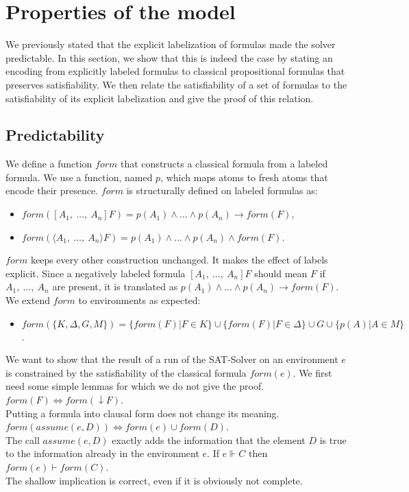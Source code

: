 \documentclass[a4paper,11pt]{article}
\newcommand{\F}{\mathit{form}}
\newcommand{\A}{\mathit{assume}}
\begin{document}
\section{Properties of the model}
We previously stated that the explicit labelization of formulas made the solver predictable.
In this section, we show that this is indeed the case by stating an encoding from
explicitly labeled formulas to classical propositional formulas that preserves satisfiability.
We then relate the satisfiability of a set of formulas to the satisfiability of
its explicit labelization and give the proof of this relation.
\subsection{Predictability}
We define a function $\F$ that constructs a classical formula from a labeled formula. We use
a function, named $p$, which maps atoms to fresh atoms that encode their presence. $\F$ is
structurally defined on labeled formulas as:
\begin{itemize}
 \item $\F([A_1,\ \dots,\ A_n]F)=p(A_1)\wedge\dots\wedge p(A_n)\rightarrow \F(F)$,
 \item $\F(\langle A_1,\ \dots,\ A_n\rangle F)= p(A_1)\wedge\dots\wedge p(A_n)\wedge \F(F)$.
\end{itemize}
$\F$ keeps every other construction unchanged. It makes the effect of labels explicit. Since a
negatively labeled formula $[A_1,\ \dots,\ A_n]F$ should mean $F$ if $A_1,\ \dots,\ A_n$ are
present, it is translated as $p(A_1)\wedge\dots\wedge p(A_n)\rightarrow \F(F)$. We extend
$\F$ to environments as expected:
\begin{itemize}
 \item $\F(\{K,\Delta,G,M\})=\{\F(F)|F\in K\}\cup\{\F(F)|F\in\Delta\}\cup G\cup\{p(A)|A\in M\}$.
\end{itemize}
We want to show that the result of a run of the SAT-Solver on an environment $e$ is constrained by
the satisfiability of the classical formula $\F(e)$. We first need some simple lemmas for which we do
not give the proof.
{\lemma $\F(F)\Leftrightarrow\F(\downarrow F)$.}\\
Putting a formula into clausal form does not change its meaning.
{\lemma $\F(\A(e,D))\Leftrightarrow\F(e)\cup\F(D)$.}\\
The call $\A(e,D)$ exactly adds the information that the element $D$ is true to the information
already in the environment $e$.
{\lemma If $e\Vdash C$ then $\F(e)\vdash\F(C)$.}\\
The shallow implication is correct, even if it is obviously not complete.
\end{document}
